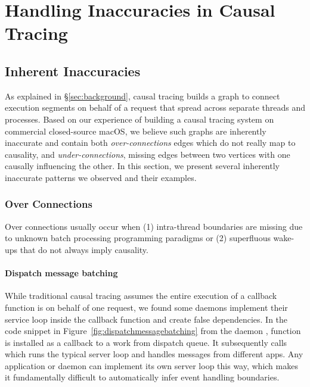 \section{Handling Inaccuracies in Causal Tracing}\label{sec:inaccuracy}

\subsection{Inherent Inaccuracies}


As explained in \S\ref{sec:background}, causal tracing builds a graph to connect
execution segments on behalf of a request that spread across separate threads
and processes. Based on our experience of building a causal tracing system on
commercial closed-source macOS, we believe such graphs are inherently inaccurate
and contain both \emph{over-connections} edges which do not really map to
causality, and \emph{under-connections}, missing edges between two vertices
with one causally influencing the other. In this section, we present several
inherently inaccurate patterns we observed and their examples.

\subsubsection{Over Connections} \label{subsec:overconnections}

Over connections usually occur when (1) intra-thread boundaries are missing due
to unknown batch processing programming paradigms or (2) superfluous wake-ups
that do not always imply causality.

\paragraph{Dispatch message batching}

While traditional causal tracing assumes the entire execution of a callback
function is on behalf of one request, we found some daemons implement their
service loop inside the callback function and create false dependencies. In the
code snippet in Figure~\ref{fig:dispatchmessagebatching} from the 
daemon , function  is installed as a callback to
a work from dispatch queue. It subsequently calls 
which runs the typical server loop and handles messages from different apps. Any
application or daemon can implement its own server loop this way, which makes it
fundamentally difficult to automatically infer event handling boundaries.

